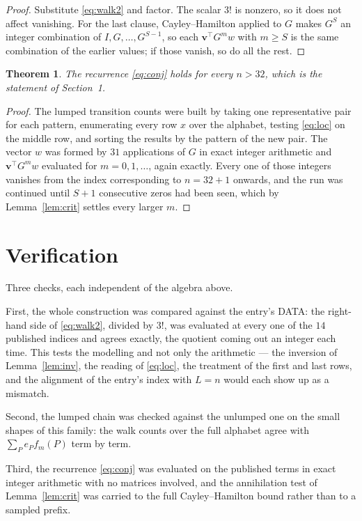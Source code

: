\documentclass[11pt,a4paper]{article}
\theoremstyle{plain}
\newtheorem{theorem}{Theorem}
\theoremstyle{definition}
\begin{document}
\begin{proof}
Substitute \eqref{eq:walk2} and factor. The scalar $3!$ is nonzero, so it does not
affect vanishing. For the last clause, Cayley--Hamilton applied to $G$ makes $G^{S}$ an
integer combination of $I,G,\dots,G^{S-1}$, so each $\mathbf{v}^{\!\top}G^{m}w$ with
$m\ge S$ is the same combination of the earlier values; if those vanish, so do all the rest.
\end{proof}

\begin{theorem}
The recurrence \eqref{eq:conj} holds for every $n>32$, which is the statement of
Section~1.
\end{theorem}

\begin{proof}
The lumped transition counts were built by taking one representative pair for each pattern,
enumerating every row $x$ over the alphabet, testing \eqref{eq:loc} on the middle
row, and sorting the results by the pattern of the new pair. The vector $w$ was formed by
$31$ applications of $G$ in exact integer arithmetic and $\mathbf{v}^{\!\top}G^{m}w$
evaluated for $m=0,1,\dots$, again exactly. Every one of those integers vanishes from the
index corresponding to $n=32+1$ onwards, and the run was continued until $S+1$
consecutive zeros had been seen, which by Lemma~\ref{lem:crit} settles every larger $m$.
\end{proof}

\section{Verification}

Three checks, each independent of the algebra above.

First, the whole construction was compared against the entry's DATA: the right-hand side of
\eqref{eq:walk2}, divided by $3!$, was evaluated at every one of the $14$
published indices and agrees exactly, the quotient coming out an integer each time. This
tests the modelling and not only the arithmetic --- the inversion of Lemma~\ref{lem:inv},
the reading of \eqref{eq:loc}, the treatment of the first and last rows, and the
alignment of the entry's index with $L=n$ would each show up as a mismatch.

Second, the lumped chain was checked against the unlumped one on the small shapes of this
family: the walk counts over the full alphabet agree with $\sum_P e_Pf_m(P)$ term by term.

Third, the recurrence \eqref{eq:conj} was evaluated on the published terms in exact integer
arithmetic with no matrices involved, and the annihilation test of Lemma~\ref{lem:crit} was
carried to the full Cayley--Hamilton bound rather than to a sampled prefix.
\end{document}

